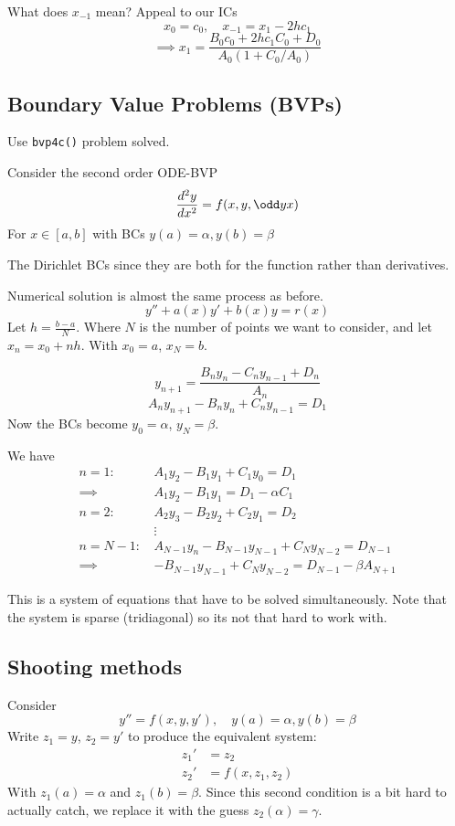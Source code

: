 \documentclass{X:/Documents/Coding/Latex/myassignment}
\begin{document}
What does $x_{-1}$ mean? 
Appeal to our ICs
\[x_0 = c_0 , \quad x_{-1} = x_1 - 2hc_1\]
\[\implies x_1  =\frac{B_0c_0 + 2h c_1C_0 + D_0}{A_0(1 + C_0/A_0)}\]


\subsection{Boundary Value Problems (BVPs)}
Use \verb|bvp4c()| problem solved. 

Consider the second order ODE-BVP
\[\frac{d^2y}{dx^2} = f(x,y,\odd yx)\] 
For $x \in \left[a,b\right]$ with BCs $y(a) = \alpha, y(b) = \beta$

The Dirichlet BCs since they are both for the function rather than derivatives.


Numerical solution is almost the same process as before.
\[y'' + a(x)y' + b(x) y = r(x)\]
Let $h = \frac{b-a}{N}$. Where $N$ is the number of points we want to consider, and let $x_n = x_0 + nh$. With $x_0 = a$, $x_N = b$.


\[y_{n+1} = \frac{B_ny_{n} - C_ny_{n-1} + D_n}{A_n}\]
\[A_n y_{n+1} - B_ny_n + C_ny_{n-1} = D_1\]
Now the BCs become $y_0 = \alpha$, $y_N = \beta$. 

We have
\begin{align*}
    n=1 : \, &A_1 y_2 - B_1 y_1 + C_1y_0 = D_1\\
    \implies &A_1 y_2 - B_1 y_1 = D_1 - \alpha C_1\\
    n=2 : \, & A_2 y_3 - B_2 y_2 + C_2 y_1 = D_2\\
    &\vdots\\
    n=N-1 : \, & A_{N-1} y_n - B_{N-1} y_{N-1} + C_N y_{N-2} = D_{N-1}\\
    \implies & -B_{N-1} y_{N-1} + C_N y_{N-2} = D_{N-1} - \beta A_{N+1}
\end{align*}

This is a system of equations that have to be solved simultaneously.
Note that the system is sparse (tridiagonal) so its not that hard to work with.





\subsection{Shooting methods}

Consider 
\[y'' = f(x,y,y'), \quad y(a) = \alpha, y(b)= \beta\]
Write $z_1 = y$, $z_2 = y'$ to produce the equivalent system:
\begin{align*}
    z_1' &= z_2\\
    z_2' &= f(x,z_1,z_2)
\end{align*}
With $z_1(a) = \alpha$ and $z_1(b) = \beta$. 
Since this second condition is a bit hard to actually catch, we replace it with the guess $z_2(\alpha) = \gamma$.
\end{document}
